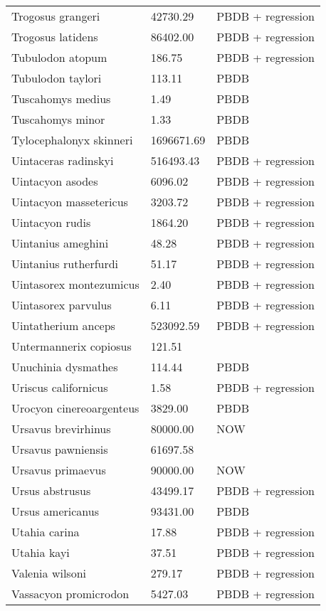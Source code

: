 \documentclass{article}
\begin{document}
\begin{center}
\begin{longtable}{p{} p{} p{}}
    Trogosus grangeri & 42730.29 & PBDB + regression \\ 
    Trogosus latidens & 86402.00 & PBDB + regression \\ 
    Tubulodon atopum & 186.75 & PBDB + regression \\ 
    Tubulodon taylori & 113.11 & PBDB \\ 
    Tuscahomys medius & 1.49 & PBDB \\ 
    Tuscahomys minor & 1.33 & PBDB \\ 
    Tylocephalonyx skinneri & 1696671.69 & PBDB \\ 
    Uintaceras radinskyi & 516493.43 & PBDB + regression \\ 
    Uintacyon asodes & 6096.02 & PBDB + regression \\ 
    Uintacyon massetericus & 3203.72 & PBDB + regression \\ 
    Uintacyon rudis & 1864.20 & PBDB + regression \\ 
    Uintanius ameghini & 48.28 & PBDB + regression \\ 
    Uintanius rutherfurdi & 51.17 & PBDB + regression \\ 
    Uintasorex montezumicus & 2.40 & PBDB + regression \\ 
    Uintasorex parvulus & 6.11 & PBDB + regression \\ 
    Uintatherium anceps & 523092.59 & PBDB + regression \\ 
    Untermannerix copiosus & 121.51 & \cite{Tomiya2013} \\ 
    Unuchinia dysmathes & 114.44 & PBDB \\ 
    Uriscus californicus & 1.58 & PBDB + regression \\ 
    Urocyon cinereoargenteus & 3829.00 & PBDB \\ 
    Ursavus brevirhinus & 80000.00 & NOW \\ 
    Ursavus pawniensis & 61697.58 & \cite{Tomiya2013} \\ 
    Ursavus primaevus & 90000.00 & NOW \\ 
    Ursus abstrusus & 43499.17 & PBDB + regression \\ 
    Ursus americanus & 93431.00 & PBDB \\ 
    Utahia carina & 17.88 & PBDB + regression \\ 
    Utahia kayi & 37.51 & PBDB + regression \\ 
    Valenia wilsoni & 279.17 & PBDB + regression \\ 
    Vassacyon promicrodon & 5427.03 & PBDB + regression \\ 

\end{longtable}
\end{center}
\end{document}
